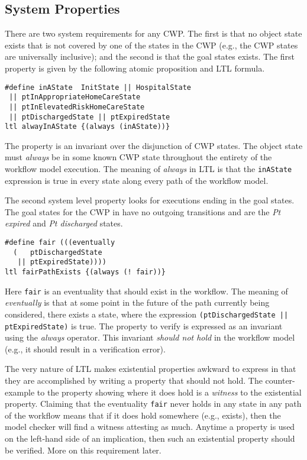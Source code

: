 \subsection{System Properties}
There are two system requirements for any CWP.
The first is that no object state exists that is not covered by one of the states in the CWP (e.g., the CWP states are universally inclusive);
and the second is that the goal states exists.
The first property is given by the following atomic proposition and LTL formula.
%
{\small
\begin{lstlisting}[style=myPromela]
#define inAState  InitState || HospitalState 
 || ptInAppropriateHomeCareState 
 || ptInElevatedRiskHomeCareState
 || ptDischargedState || ptExpiredState
ltl alwayInAState {(always (inAState))}
\end{lstlisting}
}
%
\noindent The property is an invariant over the disjunction of CWP states.
The object state must \emph{always} be in some known CWP state throughout the entirety of the workflow model execution.
The meaning of \emph{always} in LTL is that the \texttt{inAState} expression is true in every state along every path of the workflow model.

The second system level property looks for executions ending in the goal states.
The goal states for the CWP in  have no outgoing transitions and are the \emph{Pt expired} and \emph{Pt discharged} states.
%
{\small
\begin{lstlisting}[style=myPromela]
#define fair (((eventually 
  (   ptDischargedState 
   || ptExpiredState))))
ltl fairPathExists {(always (! fair))}
\end{lstlisting}
}
%
\noindent Here \texttt{fair} is an eventuality that should exist in the workflow.
The meaning of \emph{eventually} is that at some point in the future of the path currently being considered, there exists a state, where the expression \texttt{(ptDischargedState || ptExpiredState)} is true.
The property to verify is expressed as an invariant using the \emph{always} operator.
This invariant \emph{should not hold} in the workflow model (e.g., it should result in a verification error). 

The very nature of LTL makes existential properties awkward to express in that they are accomplished by writing a property that should not hold.
The counter-example to the property showing where it does hold is a \emph{witness} to the existential property.
Claiming that the eventuality \texttt{fair} never holds in any state in any path of the workflow means that if it does hold somewhere (e.g., exists), then the model checker will find a witness attesting as much.
Anytime a property is used on the left-hand side of an implication, then such an existential property should be verified.
More on this requirement later.

